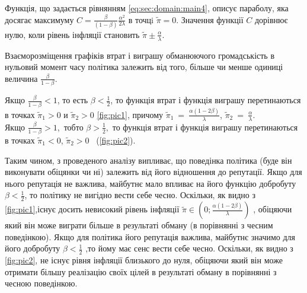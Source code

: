 Функція, що задається рівнянням \eqref{eq:sec:domain:main4}, описує параболу,
яка досягає максимуму $C=\frac{\beta}{(1-\beta)}\frac{\alpha^2}{2\lambda} $  в
точцi   $\tilde{\pi}=0$. Значення функції $C$ дорівнює нулю, коли рівень
інфляції становить $\tilde{\pi}\pm\frac{\alpha}{\lambda}$.


Взаєморозміщення графіків втрат і виграшу обманюючого громадськість в нульовий момент часу політика залежить від того, більше чи менше одиниці величина $\frac{\beta}{1-\beta}$.

Якщо   $\frac{\beta}{1-\beta}<1$, то есть  $\beta<\frac{1}{2}$, то функція втрат і функція виграшу перетинаються в точках  $\tilde{\pi}_1>0$ и $\tilde{\pi}_2>0$ \eqref{fig:pic1}, причому  $\tilde{\pi}_1~=~\frac{\alpha(1-2\beta)}{\lambda}$, $\tilde{\pi}_2~=~\frac{\alpha}{\lambda}$. \\
Якщо  $\frac{\beta}{1-\beta}>1,$  тобто  $\beta>\frac{1}{2},$  то функція втрат і функція виграшу перетинаються в точках $\tilde{\pi}_1<0$, $\tilde{\pi}_2>0$ ~(\ref{fig:pic2}).

Таким чином, з проведеного аналізу випливає, що поведінка політика (буде він виконувати обіцянки чи ні) залежить від його відношення до репутації. Якщо для нього репутація не важлива, майбутнє мало впливає на його функцію добробуту $\beta<\frac{1}{2}$, то політику не вигідно вести себе чесно. Оскільки, як видно з \eqref{fig:pic1},існує досить невисокий рівень інфляції $\tilde{\pi}\in\left(0;\frac{\alpha(1-2\beta)}{\lambda} \right)$ , обіцяючи який він може виграти більше в результаті обману (в порівнянні з чесним поведінкою). Якщо для політика його репутація важлива, майбутнє значимо для його добробуту $\beta<\frac{1}{2}$ ,то йому має сенс вести себе чесно. Оскільки, як видно з \eqref{fig:pic2}, не існує рівня інфляції близького до нуля, обіцяючи який він може отримати більшу реалізацію своїх цілей в результаті обману в порівнянні з чесною поведінкою.
